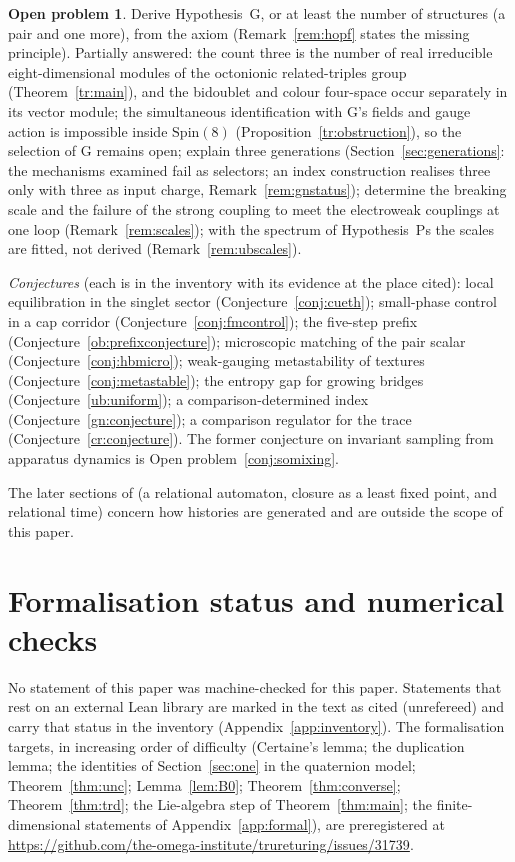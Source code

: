 \documentclass[aps,pra,onecolumn,superscriptaddress,nofootinbib,10pt]{revtex4-2}
\theoremstyle{definition}
\newtheorem{problem}{Open problem}
\theoremstyle{remark}
\begin{document}
\begin{problem}
Derive Hypothesis~G, or at least the number of structures (a pair and one more), from the axiom
(Remark~\ref{rem:hopf} states the missing principle).  Partially answered: the count three is the number of
real irreducible eight-dimensional modules of the octonionic related-triples group (Theorem~\ref{tr:main}),
and the bidoublet and colour four-space occur separately in its vector module; the simultaneous
identification with G's fields and gauge action is impossible inside $\mathrm{Spin}(8)$
(Proposition~\ref{tr:obstruction}), so the selection of G remains open; explain three generations (Section~\ref{sec:generations}: the mechanisms examined fail as selectors; an index
construction realises three only with three as input charge, Remark~\ref{rem:gnstatus}); determine the
breaking scale and the failure of the strong coupling to meet the electroweak couplings at one loop
(Remark~\ref{rem:scales}); with the spectrum of Hypothesis~Ps the scales are fitted, not derived
(Remark~\ref{rem:ubscales}).
\end{problem}
\noindent\emph{Conjectures} (each is in the inventory with its evidence at the place cited): local equilibration in the
singlet sector (Conjecture~\ref{conj:cueth}); small-phase control in a cap corridor (Conjecture~\ref{conj:fmcontrol}); the five-step
prefix (Conjecture~\ref{ob:prefixconjecture}); microscopic matching of the pair scalar (Conjecture~\ref{conj:hbmicro});
weak-gauging metastability of textures (Conjecture~\ref{conj:metastable}); the entropy gap for growing bridges
(Conjecture~\ref{ub:uniform}); a comparison-determined index (Conjecture~\ref{gn:conjecture}); a comparison regulator for the trace
(Conjecture~\ref{cr:conjecture}).  The former conjecture on invariant sampling from apparatus dynamics is Open
problem~\ref{conj:somixing}.

\noindent The later sections of \cite{CRQO} (a relational automaton, closure as a least fixed point,
and relational time) concern how histories are generated and are outside the scope of this paper.

\section{Formalisation status and numerical checks}\label{sec:lean}
{\sloppy No statement of this paper was machine-checked for this paper.  Statements that rest on an external Lean
library are marked in the text as cited (unrefereed) and carry that status in the inventory
(Appendix~\ref{app:inventory}).  The formalisation targets, in increasing order of
difficulty (Certaine's lemma; the duplication lemma; the identities of Section~\ref{sec:one} in the
quaternion model; Theorem~\ref{thm:unc}; Lemma~\ref{lem:B0}; Theorem~\ref{thm:converse};
Theorem~\ref{thm:trd}; the Lie-algebra step of Theorem~\ref{thm:main}; the finite-dimensional statements
of Appendix~\ref{app:formal}), are preregistered at
\url{https://github.com/the-omega-institute/trureturing/issues/31739}.\par}
\end{document}
